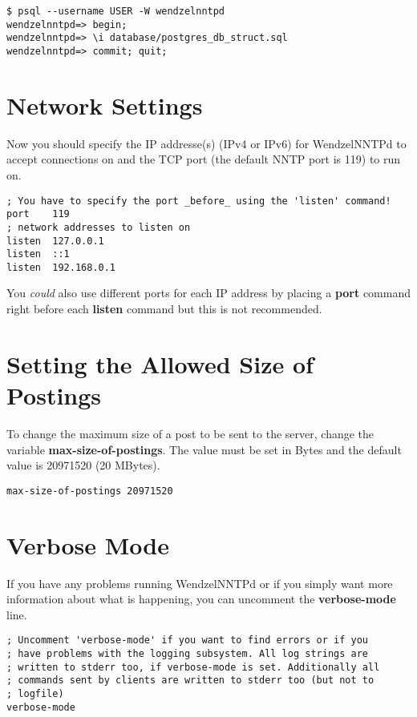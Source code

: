 \begin{verbatim}
$ psql --username USER -W wendzelnntpd
wendzelnntpd=> begin;
wendzelnntpd=> \i database/postgres_db_struct.sql
wendzelnntpd=> commit; quit;
\end{verbatim}

\section{Network Settings}

Now you should specify the IP addresse(s) (IPv4 or IPv6) for WendzelNNTPd to accept connections on and the TCP port (the default NNTP port is 119) to run on.

\begin{verbatim}
; You have to specify the port _before_ using the 'listen' command!
port	119
; network addresses to listen on
listen	127.0.0.1
listen	::1
listen	192.168.0.1
\end{verbatim}

You \textit{could} also use different ports for each IP address by placing a \textbf{port} command right before each \textbf{listen} command but this is not recommended.

\section{Setting the Allowed Size of Postings}

To change the maximum size of a post to be sent to the server, change the variable \textbf{max-size-of-postings}. The value must be set in Bytes and the default value is 20971520 (20 MBytes).

\begin{verbatim}
max-size-of-postings 20971520
\end{verbatim}

\section{Verbose Mode}

If you have any problems running WendzelNNTPd or if you simply want more information about what is happening, you can uncomment the \textbf{verbose-mode} line.

\begin{verbatim}
; Uncomment 'verbose-mode' if you want to find errors or if you
; have problems with the logging subsystem. All log strings are
; written to stderr too, if verbose-mode is set. Additionally all
; commands sent by clients are written to stderr too (but not to
; logfile)
verbose-mode
\end{verbatim}

